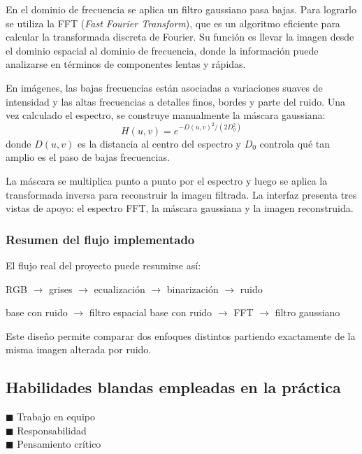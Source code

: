 \documentclass[11pt]{article}
\begin{document}
En el dominio de frecuencia se aplica un filtro gaussiano pasa bajas. Para lograrlo se utiliza la FFT (\textit{Fast Fourier Transform}), que es un algoritmo eficiente para calcular la transformada discreta de Fourier. Su función es llevar la imagen desde el dominio espacial al dominio de frecuencia, donde la información puede analizarse en términos de componentes lentas y rápidas.

En imágenes, las bajas frecuencias están asociadas a variaciones suaves de intensidad y las altas frecuencias a detalles finos, bordes y parte del ruido. Una vez calculado el espectro, se construye manualmente la máscara gaussiana:
\begin{equation}
    H(u,v)=e^{-D(u,v)^2/(2D_0^2)}
    \label{eq:gauss}
\end{equation}
donde $D(u,v)$ es la distancia al centro del espectro y $D_0$ controla qué tan amplio es el paso de bajas frecuencias.

La máscara se multiplica punto a punto por el espectro y luego se aplica la transformada inversa para reconstruir la imagen filtrada. La interfaz presenta tres vistas de apoyo: el espectro FFT, la máscara gaussiana y la imagen reconstruida.

\subsubsection{Resumen del flujo implementado}

El flujo real del proyecto puede resumirse así:
\begin{center}
RGB $\rightarrow$ grises $\rightarrow$ ecualización $\rightarrow$ binarización $\rightarrow$ ruido
\end{center}
\begin{center}
base con ruido $\rightarrow$ filtro espacial \hspace{1cm} base con ruido $\rightarrow$ FFT $\rightarrow$ filtro gaussiano
\end{center}

Este diseño permite comparar dos enfoques distintos partiendo exactamente de la misma imagen alterada por ruido.

\subsection{Habilidades blandas empleadas en la práctica}
$\blacksquare$ Trabajo en equipo \\
$\blacksquare$ Responsabilidad \\
$\blacksquare$ Pensamiento crítico
\end{document}
